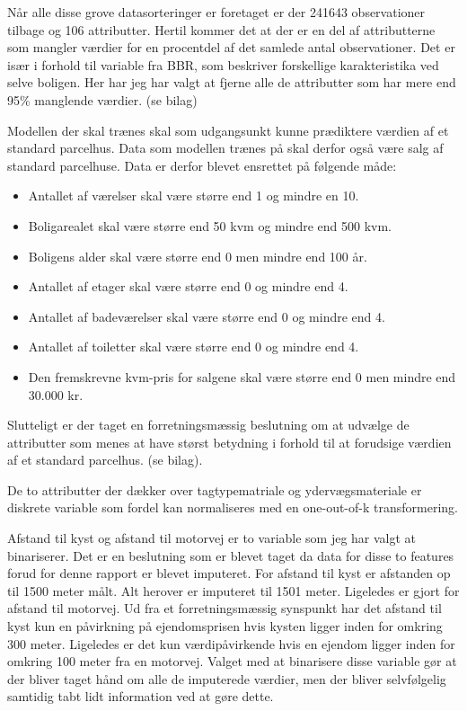 \documentclass{report}
\begin{document}
Når alle disse grove datasorteringer er foretaget er der 241643 observationer tilbage og 106 attributter.
Hertil kommer det at der er en del af attributterne som mangler værdier for en procentdel af det samlede antal observationer. Det er især i forhold til variable fra BBR, som beskriver forskellige karakteristika ved selve boligen. Her har jeg har valgt at fjerne alle de attributter som har mere end 95\% manglende værdier. (se bilag)

Modellen der skal trænes skal som udgangsunkt kunne prædiktere værdien af et standard parcelhus.  Data som modellen trænes på skal derfor også være salg af standard parcelhuse.
Data er derfor blevet ensrettet på følgende måde:

\begin{itemize}
  \item Antallet af værelser skal være større end 1 og mindre en 10.
  \item Boligarealet skal være større end 50 kvm og mindre end 500 kvm.
  \item Boligens alder skal være større end 0 men mindre end 100 år.
  \item Antallet af etager skal være større end 0 og mindre end 4.
  \item Antallet af badeværelser skal være større end 0 og mindre end 4.
  \item Antallet af toiletter skal være større end 0 og mindre end 4.
  \item Den fremskrevne kvm-pris for salgene skal være større end 0 men mindre end 30.000 kr. 
\end{itemize}

Slutteligt er der taget en forretningsmæssig beslutning om at udvælge de attributter som menes at have størst betydning i forhold til at forudsige værdien af et standard parcelhus.
(se bilag).

De to attributter der dækker over tagtypematriale og ydervægsmateriale er diskrete variable som fordel kan normaliseres med en one-out-of-k transformering.

Afstand til kyst og afstand til motorvej er to variable som jeg har valgt at binariserer. Det er en beslutning som er blevet taget da data for disse to features forud for denne rapport er blevet imputeret. For afstand til kyst er afstanden op til 1500 meter målt. Alt herover er imputeret til 1501 meter. Ligeledes er gjort for afstand til motorvej. Ud fra et forretningsmæssig synspunkt har det afstand til kyst kun en påvirkning på ejendomsprisen hvis kysten ligger inden for omkring 300 meter. Ligeledes er det kun værdipåvirkende hvis en ejendom ligger inden for omkring 100 meter fra en motorvej. Valget med at binarisere disse variable gør at der bliver taget hånd om alle de imputerede værdier, men der bliver selvfølgelig samtidig tabt lidt information ved at gøre dette.
\end{document}
